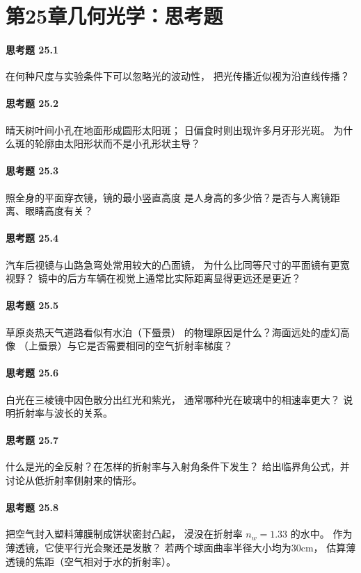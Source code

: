 \section*{第25章\quad 几何光学：思考题}
\paragraph{思考题 25.1}
在何种尺度与实验条件下可以忽略光的波动性，
把光传播近似视为沿直线传播？
\paragraph{思考题 25.2}
晴天树叶间小孔在地面形成圆形太阳斑；
日偏食时则出现许多月牙形光斑。
为什么斑的轮廓由太阳形状而不是小孔形状主导？
\paragraph{思考题 25.3}
照全身的平面穿衣镜，镜的最小竖直高度
是人身高的多少倍？是否与人离镜距离、眼睛高度有关？
\paragraph{思考题 25.4}
汽车后视镜与山路急弯处常用较大的凸面镜，
为什么比同等尺寸的平面镜有更宽视野？
镜中的后方车辆在视觉上通常比实际距离显得更远还是更近？
\paragraph{思考题 25.5}
草原炎热天气道路看似有水泊（下蜃景）
的物理原因是什么？海面远处的虚幻高像
（上蜃景）与它是否需要相同的空气折射率梯度？
\paragraph{思考题 25.6}
白光在三棱镜中因色散分出红光和紫光，
通常哪种光在玻璃中的相速率更大？
说明折射率与波长的关系。
\paragraph{思考题 25.7}
什么是光的全反射？在怎样的折射率与入射角条件下发生？
给出临界角公式，并讨论从低折射率侧射来的情形。
\paragraph{思考题 25.8}
把空气封入塑料薄膜制成饼状密封凸起，
浸没在折射率 \(n_w=1.33\) 的水中。
作为薄透镜，它使平行光会聚还是发散？
若两个球面曲率半径大小均为30cm，
估算薄透镜的焦距（空气相对于水的折射率）。

